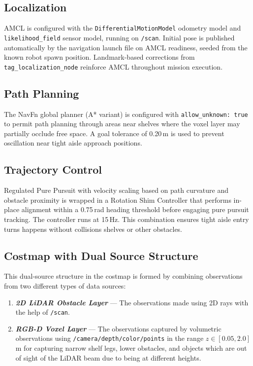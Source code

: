 \documentclass[12pt,a4paper]{report}
\begin{document}
\subsection{Localization}

AMCL is configured with the \texttt{DifferentialMotionModel} odometry model and \texttt{likelihood\_field} sensor model, running on \texttt{/scan}. Initial pose is published automatically by the navigation launch file on AMCL readiness, seeded from the known robot spawn position. Landmark-based corrections from \texttt{tag\_localization\_node} reinforce AMCL throughout mission execution.

\subsection{Path Planning}

The NavFn global planner (A* variant) is configured with \texttt{allow\_unknown: true} to permit path planning through areas near shelves where the voxel layer may partially occlude free space. A goal tolerance of 0.20\,m is used to prevent oscillation near tight aisle approach positions.

\subsection{Trajectory Control}

Regulated Pure Pursuit with velocity scaling based on path curvature and obstacle proximity is wrapped in a Rotation Shim Controller that performs in-place alignment within a 0.75\,rad heading threshold before engaging pure pursuit tracking. The controller runs at 15\,Hz. This combination ensures tight aisle entry turns happens without collisions shelves or other obstacles.

\subsection{Costmap with Dual Source Structure}

This dual-source structure in the costmap is formed by combining observations from two different types of data sources:

\begin{enumerate}
        \item \textbf{\emph{2D LiDAR Obstacle Layer}} — The observations made using 2D rays with the help of \texttt{/scan}.
        \item \textbf{\emph{RGB-D Voxel Layer}} — The observations captured by volumetric observations using \texttt{/camera/depth/color/points} in the range $z \in [0.05, 2.0]$\,m for capturing narrow shelf legs, lower obstacles, and objects which are out of sight of the LiDAR beam due to being at different heights.
\end{enumerate}
\end{document}
